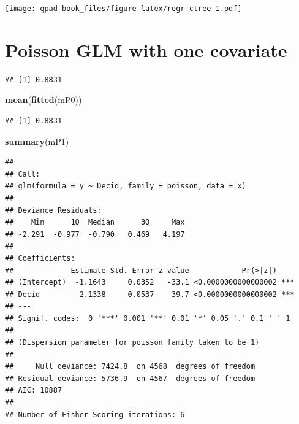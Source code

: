 \documentclass[12pt,]{book}
\newenvironment{Shaded}{\begin{snugshade}}{\end{snugshade}}
\newcommand{\DataTypeTok}[1]{\textcolor[rgb]{0.13,0.29,0.53}{#1}}
\newcommand{\KeywordTok}[1]{\textcolor[rgb]{0.13,0.29,0.53}{\textbf{#1}}}
\newcommand{\NormalTok}[1]{#1}
\newcommand{\OperatorTok}[1]{\textcolor[rgb]{0.81,0.36,0.00}{\textbf{#1}}}
\newcommand{\StringTok}[1]{\textcolor[rgb]{0.31,0.60,0.02}{#1}}
\begin{document}
\texttt{[image: qpad-book\_files/figure-latex/regr-ctree-1.pdf]}

\hypertarget{poisson-glm-with-one-covariate}{%
\section{Poisson GLM with one covariate}\label{poisson-glm-with-one-covariate}}

\begin{Shaded}
\end{Shaded}

\begin{verbatim}
## [1] 0.8831
\end{verbatim}

\begin{Shaded}
\begin{Highlighting}[]
\KeywordTok{mean}\NormalTok{(}\KeywordTok{fitted}\NormalTok{(mP0))}
\end{Highlighting}
\end{Shaded}

\begin{verbatim}
## [1] 0.8831
\end{verbatim}

\begin{Shaded}
\begin{Highlighting}[]
\KeywordTok{summary}\NormalTok{(mP1)}
\end{Highlighting}
\end{Shaded}

\begin{verbatim}
## 
## Call:
## glm(formula = y ~ Decid, family = poisson, data = x)
## 
## Deviance Residuals: 
##    Min      1Q  Median      3Q     Max  
## -2.291  -0.977  -0.790   0.469   4.197  
## 
## Coefficients:
##             Estimate Std. Error z value            Pr(>|z|)    
## (Intercept)  -1.1643     0.0352   -33.1 <0.0000000000000002 ***
## Decid         2.1338     0.0537    39.7 <0.0000000000000002 ***
## ---
## Signif. codes:  0 '***' 0.001 '**' 0.01 '*' 0.05 '.' 0.1 ' ' 1
## 
## (Dispersion parameter for poisson family taken to be 1)
## 
##     Null deviance: 7424.8  on 4568  degrees of freedom
## Residual deviance: 5736.9  on 4567  degrees of freedom
## AIC: 10887
## 
## Number of Fisher Scoring iterations: 6
\end{verbatim}
\end{document}
